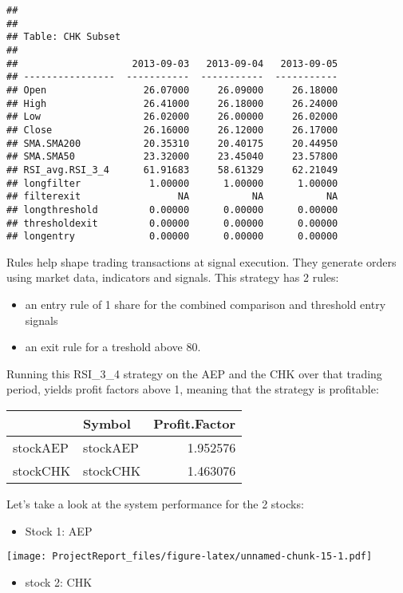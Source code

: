 \documentclass[12pt,]{article}
\providecommand{\tightlist}{%
  \setlength{\itemsep}{0pt}\setlength{\parskip}{0pt}}
\begin{document}
\begin{verbatim}
## 
## 
## Table: CHK Subset
## 
##                    2013-09-03   2013-09-04   2013-09-05
## ----------------  -----------  -----------  -----------
## Open                 26.07000     26.09000     26.18000
## High                 26.41000     26.18000     26.24000
## Low                  26.02000     26.00000     26.02000
## Close                26.16000     26.12000     26.17000
## SMA.SMA200           20.35310     20.40175     20.44950
## SMA.SMA50            23.32000     23.45040     23.57800
## RSI_avg.RSI_3_4      61.91683     58.61329     62.21049
## longfilter            1.00000      1.00000      1.00000
## filterexit                 NA           NA           NA
## longthreshold         0.00000      0.00000      0.00000
## thresholdexit         0.00000      0.00000      0.00000
## longentry             0.00000      0.00000      0.00000
\end{verbatim}

Rules help shape trading transactions at signal execution. They generate
orders using market data, indicators and signals. This strategy has 2
rules:

\begin{itemize}
\tightlist
\item
  an entry rule of 1 share for the combined comparison and threshold
  entry signals
\item
  an exit rule for a treshold above 80.
\end{itemize}

Running this RSI\_3\_4 strategy on the AEP and the CHK over that trading
period, yields profit factors above 1, meaning that the strategy is
profitable:

\begin{longtable}[]{@{}llr@{}}
\toprule
& Symbol & Profit.Factor\tabularnewline
\midrule
\endhead
stockAEP & stockAEP & 1.952576\tabularnewline
stockCHK & stockCHK & 1.463076\tabularnewline
\bottomrule
\end{longtable}

Let's take a look at the system performance for the 2 stocks:

\begin{itemize}
\tightlist
\item
  Stock 1: AEP
\end{itemize}

\texttt{[image: ProjectReport\_files/figure-latex/unnamed-chunk-15-1.pdf]}

\begin{itemize}
\tightlist
\item
  stock 2: CHK
\end{itemize}
\end{document}
